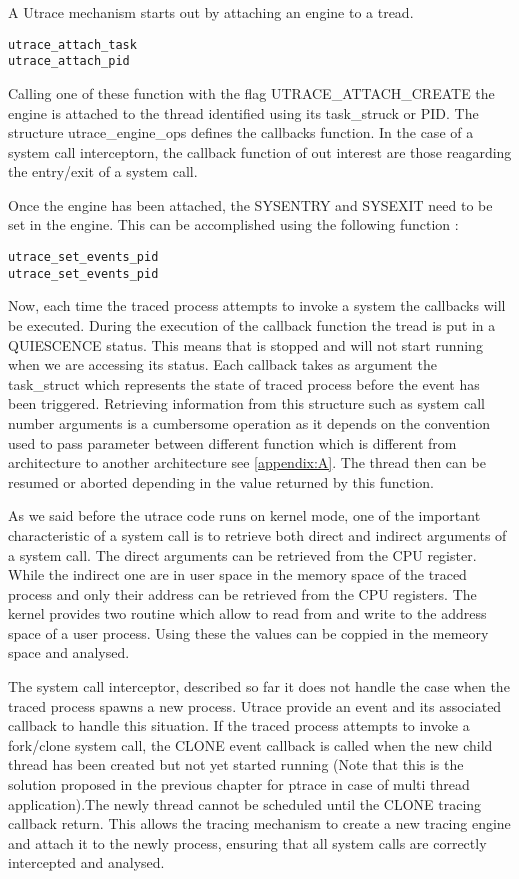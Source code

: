 A Utrace mechanism starts out by attaching an engine to a tread.

\begin{lstlisting}
utrace_attach_task
utrace_attach_pid
\end{lstlisting}

Calling one of these function with the flag UTRACE\_ATTACH\_CREATE the engine is attached to the thread identified using its task\_struck or PID. The structure utrace\_engine\_ops defines the callbacks function. In the case of a system call interceptorn, the callback function of out interest are those reagarding the entry/exit of a system call. 

Once the engine has been attached, the SYSENTRY and SYSEXIT need to be set in the engine. This can be accomplished using the following function :
\begin{lstlisting}
utrace_set_events_pid
utrace_set_events_pid
\end{lstlisting}
Now, each time the traced process attempts to invoke a system the callbacks will be executed. During the execution of the callback function the tread is put in a QUIESCENCE status. This means that is stopped and will not start running when we are accessing its status. Each callback takes as argument the task\_struct which represents the state of traced process before the event has been triggered. Retrieving information from this structure such as system call number arguments is a cumbersome operation as it depends on the convention used to pass parameter between different function which is different from architecture to another architecture see \ref{appendix:A}. The thread then can be resumed or aborted depending in the value returned by this function. 

As we said before the utrace code runs on kernel mode, one of the important characteristic of a system call is to retrieve both direct and indirect arguments of a system call. The direct arguments can be retrieved from the CPU register. While the indirect one are in user space in the memory space of the traced process and only their address can be retrieved from the CPU registers. The kernel provides two routine which allow to read from and write to the address space of a user process. Using these the values can be coppied in the memeory space and analysed. 

The system call interceptor, described so far it does not handle the case when the traced process spawns a new process. Utrace provide an event and its associated callback to handle this situation. If the traced process attempts to invoke a fork/clone system call, the CLONE event callback is called when the new child thread has been created but not yet started running (Note that this is the solution proposed in the previous chapter for ptrace in case of multi thread application).The newly thread cannot be scheduled until the CLONE tracing callback return. 
This allows the tracing mechanism to create a new tracing engine and attach it to the newly process, ensuring that all system calls are correctly intercepted and analysed. 
 
